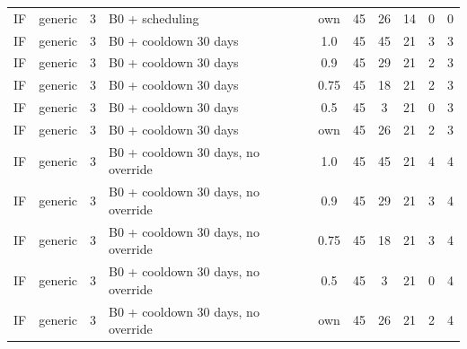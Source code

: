 \documentclass[10pt,onecolumn,letterpaper]{article}
\begin{document}
\begin{longtable}{lllp{4.4cm}cccccc}
IF & generic & 3 & B0 + scheduling & own & 45 & 26 & 14 & 0 & 0 \\
IF & generic & 3 & B0 + cooldown 30 days & 1.0 & 45 & 45 & 21 & 3 & 3 \\
IF & generic & 3 & B0 + cooldown 30 days & 0.9 & 45 & 29 & 21 & 2 & 3 \\
IF & generic & 3 & B0 + cooldown 30 days & 0.75 & 45 & 18 & 21 & 2 & 3 \\
IF & generic & 3 & B0 + cooldown 30 days & 0.5 & 45 & 3 & 21 & 0 & 3 \\
IF & generic & 3 & B0 + cooldown 30 days & own & 45 & 26 & 21 & 2 & 3 \\
IF & generic & 3 & B0 + cooldown 30 days, no override & 1.0 & 45 & 45 & 21 & 4 & 4 \\
IF & generic & 3 & B0 + cooldown 30 days, no override & 0.9 & 45 & 29 & 21 & 3 & 4 \\
IF & generic & 3 & B0 + cooldown 30 days, no override & 0.75 & 45 & 18 & 21 & 3 & 4 \\
IF & generic & 3 & B0 + cooldown 30 days, no override & 0.5 & 45 & 3 & 21 & 0 & 4 \\
IF & generic & 3 & B0 + cooldown 30 days, no override & own & 45 & 26 & 21 & 2 & 4 \\
\bottomrule
\end{longtable}
\end{document}

